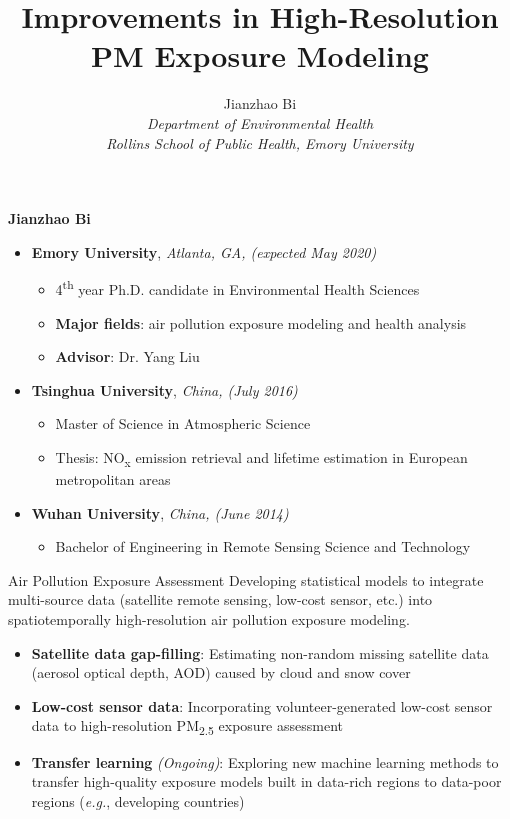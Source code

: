\documentclass[12pt]{beamer}
\title[Improvements in PM\tsub{2.5} Exposure Modeling]{Improvements in High-Resolution PM\tsub{2.5} Exposure Modeling}
\author[Bi, J.]{Jianzhao Bi \\ \vspace{0.3cm} \sl{Department of Environmental Health \\ Rollins School of Public Health, Emory University}}
\begin{document}
\begin{frame}{}
    \textbf{\Large Jianzhao Bi}
    \vspace{0.5cm}
    \begin{itemize}
        \item \textbf{Emory University}, \textsl{Atlanta, GA, (expected May 2020)}
        \begin{itemize}
            \item 4\textsuperscript{th} year Ph.D. candidate in Environmental Health Sciences
            \item \textbf{Major fields}: air pollution exposure modeling and health analysis
            \item \textbf{Advisor}: Dr. Yang Liu
        \end{itemize}
        \item \textbf{Tsinghua University}, \textsl{China, (July 2016)}
        \begin{itemize}
            \item Master of Science in Atmospheric Science 
            \item Thesis: NO\textsubscript{x} emission retrieval and lifetime estimation in European metropolitan areas
        \end{itemize}
        \item \textbf{Wuhan University}, \textsl{China, (June 2014)}
        \begin{itemize}
            \item Bachelor of Engineering in Remote Sensing Science and Technology
        \end{itemize}
    \end{itemize}
\end{frame}

\begin{frame}{Air Pollution Exposure Assessment}
Developing statistical models to integrate multi-source data (satellite remote sensing, low-cost sensor, etc.) into spatiotemporally high-resolution air pollution exposure modeling.
\vspace{0.5cm}
    \begin{itemize}
        \item \textbf{Satellite data gap-filling}: Estimating non-random missing satellite data (aerosol optical depth, AOD) caused by cloud and snow cover
        \item \textbf{Low-cost sensor data}: Incorporating volunteer-generated low-cost sensor data to high-resolution PM\textsubscript{2.5} exposure assessment
        \item \textbf{Transfer learning} \textsl{(Ongoing)}:  Exploring new machine learning methods to transfer high-quality exposure models built in data-rich regions to data-poor regions (\textit{e.g.}, developing countries)
    \end{itemize}
\end{frame}
\end{document}
